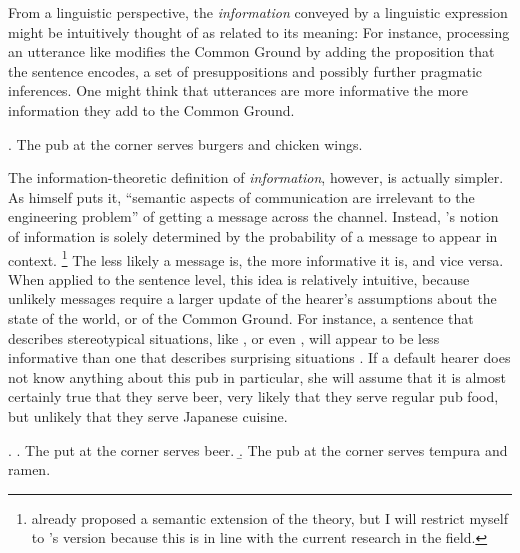 From a linguistic perspective, the \textit{information} conveyed by a linguistic expression might be intuitively thought of as related to its meaning: For instance, processing an utterance like \Next modifies the Common Ground \citep{stalnaker2002} by adding the proposition that the sentence encodes, a set of presuppositions and possibly further pragmatic inferences. One might think that utterances are more informative the more information they add to the Common Ground.

\ex. The pub at the corner serves burgers and chicken wings.

The information-theoretic definition of \textit{information}, however, is actually simpler. As \citet[379]{shannon1948} himself puts it, ``semantic aspects of communication are irrelevant to the engineering problem'' of getting a message across the channel. Instead, \citeauthor{shannon1948}'s notion of information is solely determined by the probability of a message to appear in context.%
%
\footnote{\citet{bar-hillel.carnap1953} already proposed a semantic extension of the theory, but I will restrict myself to \citeauthor{shannon1948}'s version because this is in line with the current research in the field.}\afterfn%
%
The less likely a message is, the more informative it is, and vice versa. When applied to the sentence level, this idea is relatively intuitive, because unlikely messages require a larger update of the hearer's assumptions about the state of the world, or of the Common Ground. For instance, a sentence that describes stereotypical situations, like \Last, or even \Next[a], will appear to be less informative than one that describes surprising situations \Next[b]. If a default hearer does not know anything about this pub in particular, she will assume that it is almost certainly true that they serve beer, very likely that they serve regular pub food, but unlikely that they serve Japanese cuisine.


\ex. \a. The put at the corner serves beer.
     \b. The pub at the corner serves tempura and ramen.

